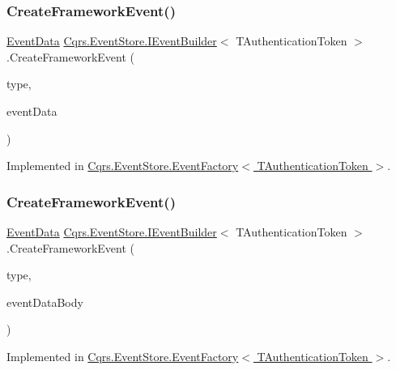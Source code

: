 \subsubsection{\texorpdfstring{Create\+Framework\+Event()}{CreateFrameworkEvent()}\hspace{0.1cm}{\footnotesize\ttfamily [3/4]}}
{\footnotesize\ttfamily \hyperlink{classCqrs_1_1Events_1_1EventData}{Event\+Data} \hyperlink{interfaceCqrs_1_1EventStore_1_1IEventBuilder}{Cqrs.\+Event\+Store.\+I\+Event\+Builder}$<$ T\+Authentication\+Token $>$.Create\+Framework\+Event (\begin{DoxyParamCaption}\item[{string}]{type,  }\item[{\hyperlink{interfaceCqrs_1_1Events_1_1IEvent}{I\+Event}$<$ T\+Authentication\+Token $>$}]{event\+Data }\end{DoxyParamCaption})}



Implemented in \hyperlink{classCqrs_1_1EventStore_1_1EventFactory_a91394437675f3185d2105c6a79f7b5aa_a91394437675f3185d2105c6a79f7b5aa}{Cqrs.\+Event\+Store.\+Event\+Factory$<$ T\+Authentication\+Token $>$}.

\mbox{\label{interfaceCqrs_1_1EventStore_1_1IEventBuilder_a8e3df7af1f54ac873d1a768b78b82c6d_a8e3df7af1f54ac873d1a768b78b82c6d}} 
\subsubsection{\texorpdfstring{Create\+Framework\+Event()}{CreateFrameworkEvent()}\hspace{0.1cm}{\footnotesize\ttfamily [4/4]}}
{\footnotesize\ttfamily \hyperlink{classCqrs_1_1Events_1_1EventData}{Event\+Data} \hyperlink{interfaceCqrs_1_1EventStore_1_1IEventBuilder}{Cqrs.\+Event\+Store.\+I\+Event\+Builder}$<$ T\+Authentication\+Token $>$.Create\+Framework\+Event (\begin{DoxyParamCaption}\item[{string}]{type,  }\item[{string}]{event\+Data\+Body }\end{DoxyParamCaption})}



Implemented in \hyperlink{classCqrs_1_1EventStore_1_1EventFactory_a9e04e262a8af8f60bdde7b4bf3eafebb_a9e04e262a8af8f60bdde7b4bf3eafebb}{Cqrs.\+Event\+Store.\+Event\+Factory$<$ T\+Authentication\+Token $>$}.

